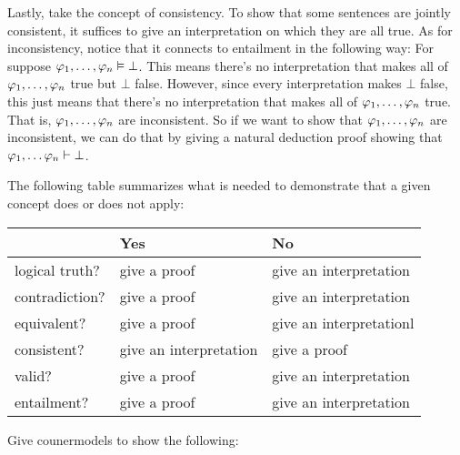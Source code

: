 Lastly, take the concept of consistency.  To show that some sentences are jointly consistent, it suffices to give an interpretation on which they are all true.  As for inconsistency, notice that it connects to entailment in the following way:
For suppose  $\mathcal{\varphi}_1, \ldots, \mathcal{\varphi}_n \vDash \bot$.  This means there's no interpretation that makes all of $\mathcal{\varphi}_1, \ldots, \mathcal{\varphi}_n $ true but $\bot$ false.  However, since every interpretation makes $\bot$ false, this just means that there's no interpretation that makes all of $\mathcal{\varphi}_1, \ldots, \mathcal{\varphi}_n $ true.  That is, $\mathcal{\varphi}_1, \ldots, \mathcal{\varphi}_n $ are inconsistent.    So if we want to show that $\mathcal{\varphi}_1, \ldots, \mathcal{\varphi}_n $ are inconsistent, we can do that by giving a natural deduction proof showing that $\mathcal{\varphi}_1, \ldots \mathcal{\varphi}_n \vdash \bot $.

The following table summarizes what is needed to demonstrate that a given concept does or does not apply:

\begin{center}
\begin{tabular}{l l l}
 & \textbf{Yes} & \textbf{No}\\
 \hline
logical truth? & give a proof & give an interpretation\\
contradiction? &  give a proof  & give an interpretation\\
equivalent? & give a proof & give an interpretationl\\
consistent? & give an interpretation & give a proof\\
valid? & give a proof & give an interpretation\\
entailment? & give a proof & give an interpretation\\
\end{tabular}
\end{center}


\practiceproblems

\problempart
Give counermodels to show the following:

